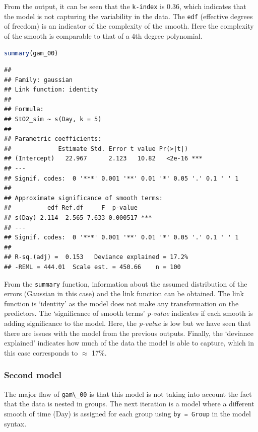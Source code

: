 \documentclass[
]{article}
\newcommand{\passthrough}[1]{#1}
\begin{document}
From the output, it can be seen that the \passthrough{\lstinline!k-index!} is 0.36, which indicates that the model is not capturing the variability in the data. The \passthrough{\lstinline!edf!} (effective degrees of freedom) is an indicator of the complexity of the smooth. Here the complexity of the smooth is comparable to that of a 4th degree polynomial.

\begin{lstlisting}[language=R]
summary(gam_00)
\end{lstlisting}

\begin{lstlisting}
## 
## Family: gaussian 
## Link function: identity 
## 
## Formula:
## StO2_sim ~ s(Day, k = 5)
## 
## Parametric coefficients:
##             Estimate Std. Error t value Pr(>|t|)    
## (Intercept)   22.967      2.123   10.82   <2e-16 ***
## ---
## Signif. codes:  0 '***' 0.001 '**' 0.01 '*' 0.05 '.' 0.1 ' ' 1
## 
## Approximate significance of smooth terms:
##          edf Ref.df     F  p-value    
## s(Day) 2.114  2.565 7.633 0.000517 ***
## ---
## Signif. codes:  0 '***' 0.001 '**' 0.01 '*' 0.05 '.' 0.1 ' ' 1
## 
## R-sq.(adj) =  0.153   Deviance explained = 17.2%
## -REML = 444.01  Scale est. = 450.66    n = 100
\end{lstlisting}

From the \passthrough{\lstinline!summary!} function, information about the assumed distribution of the errors (Gaussian in this case) and the link function can be obtained. The link function is `identity' as the model does not make any transformation on the predictors. The `significance of smooth terms' \emph{p-value} indicates if each smooth is adding significance to the model. Here, the \emph{p-value} is low but we have seen that there are issues with the model from the previous outputs. Finally, the `deviance explained' indicates how much of the data the model is able to capture, which in this case corresponds to \(\approx\) 17\%.

\hypertarget{second-model}{%
\subsubsection{Second model}\label{second-model}}

The major flaw of \passthrough{\lstinline!gam\_00!} is that this model is not taking into account the fact that the data is nested in groups. The next iteration is a model where a different smooth of time (Day) is assigned for each group using \passthrough{\lstinline!by = Group!} in the model syntax.
\end{document}
